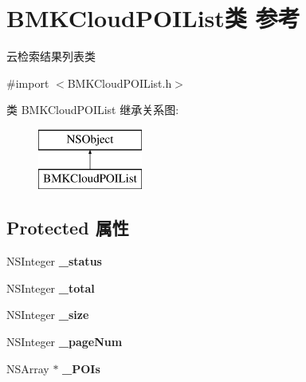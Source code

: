 \hypertarget{interface_b_m_k_cloud_p_o_i_list}{\section{B\+M\+K\+Cloud\+P\+O\+I\+List类 参考}
\label{interface_b_m_k_cloud_p_o_i_list}
}


云检索结果列表类  




{\ttfamily \#import $<$B\+M\+K\+Cloud\+P\+O\+I\+List.\+h$>$}

类 B\+M\+K\+Cloud\+P\+O\+I\+List 继承关系图\+:\begin{figure}[H]
\begin{center}
\leavevmode
\includegraphics[height=2.000000cm]{interface_b_m_k_cloud_p_o_i_list}
\end{center}
\end{figure}
\subsection*{Protected 属性}
\begin{DoxyCompactItemize}
\item 
\hypertarget{interface_b_m_k_cloud_p_o_i_list_aeb5ee15bcbcfeaceb50cc735bcd5ca88}{N\+S\+Integer {\bfseries \+\_\+status}}\label{interface_b_m_k_cloud_p_o_i_list_aeb5ee15bcbcfeaceb50cc735bcd5ca88}

\item 
\hypertarget{interface_b_m_k_cloud_p_o_i_list_a0dead6846580429a7bca29d4c6336b90}{N\+S\+Integer {\bfseries \+\_\+total}}\label{interface_b_m_k_cloud_p_o_i_list_a0dead6846580429a7bca29d4c6336b90}

\item 
\hypertarget{interface_b_m_k_cloud_p_o_i_list_a43b86ee89f20f0bf99d10140fbc485ca}{N\+S\+Integer {\bfseries \+\_\+size}}\label{interface_b_m_k_cloud_p_o_i_list_a43b86ee89f20f0bf99d10140fbc485ca}

\item 
\hypertarget{interface_b_m_k_cloud_p_o_i_list_a1889b7fae8eef754ecac35daf15e65c6}{N\+S\+Integer {\bfseries \+\_\+page\+Num}}\label{interface_b_m_k_cloud_p_o_i_list_a1889b7fae8eef754ecac35daf15e65c6}

\item 
\hypertarget{interface_b_m_k_cloud_p_o_i_list_a513d425912e3517a7ae9286d8ef39d49}{N\+S\+Array $\ast$ {\bfseries \+\_\+\+P\+O\+Is}}\label{interface_b_m_k_cloud_p_o_i_list_a513d425912e3517a7ae9286d8ef39d49}

\end{DoxyCompactItemize}
